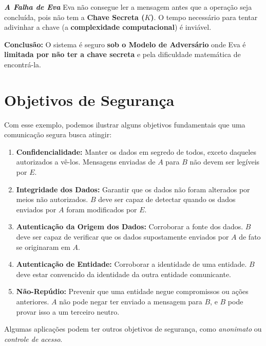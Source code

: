 \documentclass{article}
\theoremstyle{definicao_estilo}
\begin{document}
\par\vspace{0.5em}

\textbf{\textit{A Falha de Eva}}
Eva não consegue ler a mensagem antes que a operação seja concluída, pois não tem a \textbf{Chave Secreta ($K$)}. O tempo necessário para tentar adivinhar a chave (a \textbf{complexidade computacional}) é inviável.

\par
\textbf{Conclusão:} O sistema é seguro \textbf{sob o Modelo de Adversário} onde Eva é \textbf{limitada por não ter a chave secreta} e pela dificuldade matemática de encontrá-la.

\section{Objetivos de Segurança}


Com esse exemplo, podemos ilustrar alguns objetivos fundamentais que uma comunicação segura busca atingir:

\begin{enumerate}
\item \textbf{Confidencialidade:} Manter os dados em segredo de todos, exceto daqueles autorizados a vê-los. Mensagens enviadas de $A$ para $B$ não devem ser legíveis por $E$.
\item \textbf{Integridade dos Dados:} Garantir que os dados não foram alterados por meios não autorizados. $B$ deve ser capaz de detectar quando os dados enviados por $A$ foram modificados por $E$.
\item \textbf{Autenticação da Origem dos Dados:} Corroborar a fonte dos dados. $B$ deve ser capaz de verificar que os dados supostamente enviados por $A$ de fato se originaram em $A$.
\item \textbf{Autenticação de Entidade:} Corroborar a identidade de uma entidade. $B$ deve estar convencido da identidade da outra entidade comunicante.
\item \textbf{Não-Repúdio:} Prevenir que uma entidade negue compromissos ou ações anteriores. $A$ não pode negar ter enviado a mensagem para $B$, e $B$ pode provar isso a um terceiro neutro.
\end{enumerate}
Algumas aplicações podem ter outros objetivos de segurança, como \textit{anonimato} ou \textit{controle de acesso}.

\end{document}
